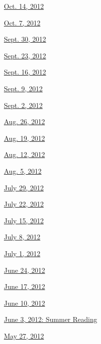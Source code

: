 \href{http://www.nytimes.com/indexes/2012/10/14/books/review/index.html}{Oct.
14, 2012}

\href{http://www.nytimes.com/indexes/2012/10/07/books/review/index.html}{Oct.
7, 2012}

\href{http://www.nytimes.com/indexes/2012/09/30/books/review/index.html}{Sept.
30, 2012}

\href{http://www.nytimes.com/indexes/2012/09/23/books/review/index.html}{Sept.
23, 2012}

\href{http://www.nytimes.com/indexes/2012/09/16/books/review/index.html}{Sept.
16, 2012}

\href{http://www.nytimes.com/indexes/2012/09/09/books/review/index.html}{Sept.
9, 2012}

\href{http://www.nytimes.com/indexes/2012/09/02/books/review/index.html}{Sept.
2, 2012}

\href{http://www.nytimes.com/indexes/2012/08/26/books/review/index.html}{Aug.
26, 2012}

\href{http://www.nytimes.com/indexes/2012/08/19/books/review/index.html}{Aug.
19, 2012}

\href{http://www.nytimes.com/indexes/2012/08/12/books/review/index.html}{Aug.
12, 2012}

\href{http://www.nytimes.com/indexes/2012/08/05/books/review/index.html}{Aug.
5, 2012}

\href{http://www.nytimes.com/indexes/2012/07/29/books/review/index.html}{July
29, 2012}

\href{http://www.nytimes.com/indexes/2012/07/22/books/review/index.html}{July
22, 2012}

\href{http://www.nytimes.com/indexes/2012/07/15/books/review/index.html}{July
15, 2012}

\href{http://www.nytimes.com/indexes/2012/07/08/books/review/index.html}{July
8, 2012}

\href{http://www.nytimes.com/indexes/2012/07/01/books/review/index.html}{July
1, 2012}

\href{http://www.nytimes.com/indexes/2012/06/24/books/review/index.html}{June
24, 2012}

\href{http://www.nytimes.com/indexes/2012/06/17/books/review/index.html}{June
17, 2012}

\href{http://www.nytimes.com/indexes/2012/06/10/books/review/index.html}{June
10, 2012}

\href{http://www.nytimes.com/indexes/2012/06/03/books/review/index.html}{June
3, 2012: Summer Reading}

\href{http://www.nytimes.com/indexes/2012/05/27/books/review/index.html}{May
27, 2012}


